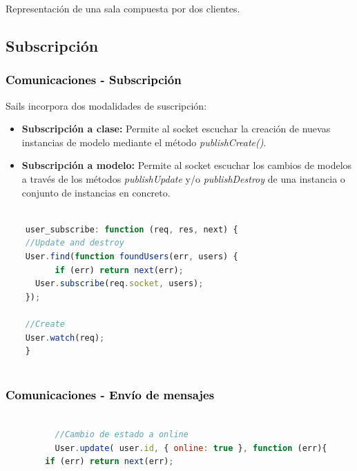 \documentclass[xcolor=x11names,compress]{beamer}
\theoremstyle{cuadrado}
\begin{document}
{{\begin{center}
Representación de una sala compuesta por dos clientes.
\end{center}

}


\subsection{Subscripción}

\begin{frame}[fragile]
\frametitle{\textcolor{black}{ Comunicaciones - Subscripción}}
Sails incorpora dos modalidades de suscripción:

\begin{itemize}
 \item \textbf{ Subscripción a clase:} Permite al socket escuchar la creación de nuevas instancias de modelo mediante el método \emph{publishCreate()}. 
 \item \textbf{Subscripción a modelo:} Permite al socket escuchar los cambios de modelos a través de los métodos \emph{publishUpdate} y/o \emph{publishDestroy} de una instancia o conjunto de instancias en concreto.
\end{itemize}

\begin{adjustwidth}{-2em}{-1em}

  \begin{lstlisting}[language=JavaScript]

    user_subscribe: function (req, res, next) {
	//Update and destroy
	User.find(function foundUsers(err, users) {
          if (err) return next(err);
	  User.subscribe(req.socket, users);
	});

	//Create
	User.watch(req);
    }
    
  \end{lstlisting}
\end{adjustwidth}

\end{frame}



\begin{frame}[fragile]
\frametitle{\textcolor{black}{ Comunicaciones - Envío de mensajes }}


\begin{adjustwidth}{-8em}{-1em}
      \begin{lstlisting}[language=JavaScript]

	      //Cambio de estado a online
	      User.update( user.id, { online: true }, function (err){
		if (err) return next(err);


\end{lstlisting}
\end{adjustwidth}
\end{frame}}
\end{document}
